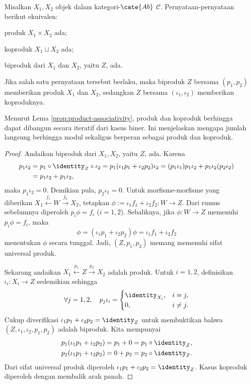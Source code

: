 \begin{theorem}\label{prop:biproduct-criterion}
	Misalkan $X_1, X_2$ objek dalam kategori-$\cate{Ab}$ $\mathcal{C}$. Pernyataan-pernyataan berikut ekuivalen:
	\begin{compactenum}[(i)]
		\item produk $X _1\times X_2$ ada;
		\item koproduk $X_1 \sqcup X_2$ ada;
		\item biproduk dari $X_1$ dan $X_2$, yaitu $Z$, ada.
	\end{compactenum}
	Jika salah satu pernyataan tersebut berlaku, maka biproduk $Z$ bersama $(p_1, p_2)$ memberikan produk $X_1$ dan $X_2$, sedangkan $Z$ bersama $(\iota_1, \iota_2)$ memberikan koproduknya.
\end{theorem}
Menurut Lema \ref{prop:product-associativity}, produk dan koproduk berhingga dapat dibangun secara iteratif dari kasus biner. Ini menjelaskan mengapa jumlah langsung berhingga modul sekaligus berperan sebagai produk dan koproduk.
\begin{proof}
	Andaikan biproduk dari $X_1, X_2$, yaitu $Z$, ada. Karena
	\begin{align*}
		p_1 \iota_2 & = p_1 \circ \identity_Z \circ \iota_2 =  p_1 (\iota_1 p_1 + \iota_2 p_2) \iota_2 = (p_1 \iota_1) p_1 \iota_2 + p_1 \iota_2 (p_2 \iota_2)  \\
		& = p_1 \iota_2 + p_1 \iota_2,
	\end{align*}
	maka $p_1 \iota_2 = 0$. Demikian pula, $p_2 \iota_1 = 0$. Untuk morfisme-morfisme yang diberikan $X_1 \xleftarrow{f_1} W \xrightarrow{f_2} X_2$, tetapkan $\phi := \iota_1 f_1 + \iota_2 f_2 : W \to Z$. Dari rumus sebelumnya diperoleh $p_i \phi = f_i$ ($i=1,2$). Sebaliknya, jika $\phi: W \to Z$ memenuhi $p_i \phi = f_i$, maka
	\[ \phi = (\iota_1 p_1 + \iota_2 p_2) \phi = \iota_1 f_1 + \iota_2 f_2 \]
	menentukan $\phi$ secara tunggal. Jadi, $(Z, p_1, p_2)$ memang memenuhi sifat universal produk.

	Sekarang andaikan $X_1 \xleftarrow{p_1} Z \xrightarrow{p_2} X_2$ adalah produk. Untuk $i=1,2$, definisikan $\iota_i: X_i \to Z$ sedemikian sehingga
	\[ \forall j=1,2, \quad  p_j \iota_i =
		\begin{cases}
			\identity_{X_i}, & i=j, \\
			0, & i \neq j .
		\end{cases}
	\]
	Cukup diverifikasi $\iota_1 p_1 + \iota_2 p_2 = \identity_Z$ untuk membuktikan bahwa $(Z, \iota_1, \iota_2, p_1, p_2)$ adalah biproduk. Kita mempunyai
	\begin{align*}
		p_1 (\iota_1 p_1 + \iota_2 p_2) & = p_1 + 0 = p_1 \circ \identity_Z , \\
		p_2 (\iota_1 p_1 + \iota_2 p_2) & = 0 + p_2 = p_2 \circ \identity_Z.
	\end{align*}
	Dari sifat universal produk diperoleh $\iota_1 p_1 + \iota_2 p_2 = \identity_Z$. Kasus koproduk diperoleh dengan membalik arah panah.
\end{proof}
